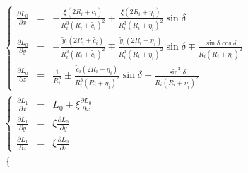 \documentclass{jarticle}
\newcommand{\yy}[1]{\tilde{y}_#1}
\newcommand{\cc}[1]{\tilde{c}_#1}
\newcommand{\re}[1]{R_#1+\eta_#1}
\newcommand{\rc}[1]{R_#1+\tilde{c_#1}}
\begin{document}
\begin{eqnarray*}
&&\left\{
\begin{array}{lcl}
  \displaystyle \frac{\partial L_0}{\partial x}
  &=&
  \displaystyle -\frac{\xi(2\rc{i})}{R_i^3(\rc{i})^2}
  \mp\frac{\xi(2\re{i})}{R_i^3(\re{i})^2}\sin\delta\\
%
  \displaystyle \frac{\partial L_0}{\partial y}
  &=&
  \displaystyle -\frac{\yy{i}(2\rc{i})}{R_i^3(\rc{i})^2}
  \mp\frac{\yy{i}(2\re{i})}{R_i^3(\re{i})^2}\sin\delta
  \mp\frac{\sin\delta\cos\delta}{R_i(\re{i})^2}\\

%
  \displaystyle \frac{\partial L_0}{\partial z}
  &=&
  \displaystyle \frac{1}{R_i^3}
  \pm\frac{\cc{i}(2\re{i})}{R_i^3(\re{i})^2}\sin\delta
  -\frac{\sin^2\delta}{R_i(\re{i})^2}
\end{array}
\right.\\
&&\left\{
\begin{array}{lcl}
  \displaystyle \frac{\partial L_1}{\partial x}
  &=&
  \displaystyle L_0 + \xi\frac{\partial L_0}{\partial x}\\
%
  \displaystyle \frac{\partial L_1}{\partial y}
  &=&
  \displaystyle \xi\frac{\partial L_0}{\partial y}\\
%
  \displaystyle \frac{\partial L_1}{\partial z}
  &=&
  \displaystyle \xi\frac{\partial L_0}{\partial z}
\end{array}
\right.\\
&&\left\{

\end{eqnarray*}
\end{document}
